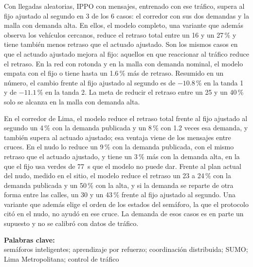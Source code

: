Con llegadas aleatorias, IPPO con mensajes, entrenado con ese tráfico, supera al fijo ajustado al segundo en 3 de los 6 casos: el corredor con sus dos demandas y la malla con demanda alta. En ellos, el modelo completo, una variante que además observa los vehículos cercanos, reduce el retraso total entre un 16 y un 27\,\% y tiene también menos retraso que el actuado ajustado. Son los mismos casos en que el actuado ajustado mejora al fijo: aquellos en que reaccionar al tráfico reduce el retraso. En la red con rotonda y en la malla con demanda nominal, el modelo empata con el fijo o tiene hasta un 1.6\,\% más de retraso. Resumido en un número, el cambio frente al fijo ajustado al segundo es de $-10.8$\,\% en la tanda 1 y de $-11.1$\,\% en la tanda 2. La meta de reducir el retraso entre un 25 y un 40\,\% solo se alcanza en la malla con demanda alta.

En el corredor de Lima, el modelo reduce el retraso total frente al fijo ajustado al segundo un 4\,\% con la demanda publicada y un 8\,\% con 1.2 veces esa demanda, y también supera al actuado ajustado; esa ventaja viene de los mensajes entre cruces. En el nudo lo reduce un 9\,\% con la demanda publicada, con el mismo retraso que el actuado ajustado, y tiene un 3\,\% más con la demanda alta, en la que el fijo usa verdes de 77~s que el modelo no puede dar. Frente al plan actual del nudo, medido en el sitio, el modelo reduce el retraso un 23 a 24\,\% con la demanda publicada y un 50\,\% con la alta, y si la demanda se reparte de otra forma entre las calles, un 30 y un 43\,\% frente al fijo ajustado al segundo. Una variante que además elige el orden de los estados del semáforo, la que el protocolo citó en el nudo, no ayudó en ese cruce. La demanda de esos casos es en parte un supuesto y no se calibró con datos de tráfico.

\noindent \textbf{Palabras clave:}\\
\noindent semáforos inteligentes; aprendizaje por refuerzo; coordinación distribuida; SUMO; Lima Metropolitana; control de tráfico
